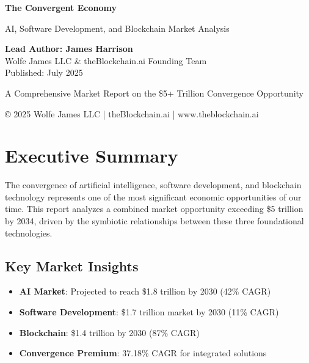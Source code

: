 \documentclass[11pt,a4paper]{report}
\begin{document}
\begin{titlepage}
\centering
\vspace*{2cm}

{\Huge\bfseries\color{primaryblue} The Convergent Economy}

\vspace{1cm}

{\Large\color{accentgreen} AI, Software Development, and Blockchain Market Analysis}

\vspace{1cm}

{\large\bfseries Lead Author: James Harrison}\\[0.2cm]
{\normalsize Wolfe James LLC \& theBlockchain.ai Founding Team}\\[0.5cm]
{\normalsize Published: July 2025}

\vspace{1cm}

{\large A Comprehensive Market Report on the \$5+ Trillion Convergence Opportunity}

\vspace{2cm}

{\small © 2025 Wolfe James LLC | theBlockchain.ai | www.theblockchain.ai}

\vfill
\end{titlepage}

\tableofcontents
\newpage

\chapter*{Executive Summary}

The convergence of artificial intelligence, software development, and blockchain technology represents one of the most significant economic opportunities of our time. This report analyzes a combined market opportunity exceeding \$5 trillion by 2034, driven by the symbiotic relationships between these three foundational technologies.

\section*{Key Market Insights}

\begin{itemize}
\item \textbf{AI Market}: Projected to reach \$1.8 trillion by 2030 (42\% CAGR)
\item \textbf{Software Development}: \$1.7 trillion market by 2030 (11\% CAGR)  
\item \textbf{Blockchain}: \$1.4 trillion by 2030 (87\% CAGR)
\item \textbf{Convergence Premium}: 37.18\% CAGR for integrated solutions
\end{itemize}
\end{document}
